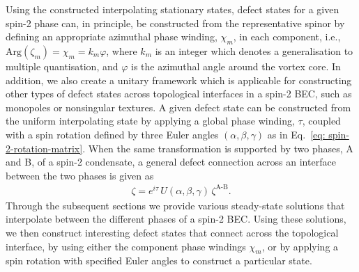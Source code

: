 Using the constructed interpolating stationary states, defect states for a given
spin-2 phase can, in principle, be constructed from
the representative spinor by defining an appropriate azimuthal phase winding,
\(\chi_m \), in each component, i.e., \(\text{Arg}(\zeta_m) =\chi_m =
k_m\varphi \), where \(k_m\) is an integer which denotes a generalisation to
multiple quantisation, and \(\varphi \) is the azimuthal angle around the vortex
core.
In addition, we also create a unitary framework which is applicable for
constructing other types of defect states across topological interfaces in a
spin-2 BEC, such as monopoles or nonsingular textures.
A given defect state can be constructed from the uniform interpolating state by
applying a global phase winding, \(\tau \), coupled with a spin rotation defined
by three Euler angles \((\alpha, \beta, \gamma)\) as in
Eq.~\eqref{eq: spin-2-rotation-matrix}.
When the same transformation is supported by two phases, A and B, of a spin-2
condensate, a general defect connection across an interface between the two
phases is given as
\begin{align}\label{eq: general-defect-interface}
    \zeta = e^{i\tau}\,U(\alpha, \beta, \gamma)\,\zeta^\text{A-B}.
\end{align}
Through the subsequent sections we provide various steady-state solutions that
interpolate between the different phases of a spin-2 BEC\@.
Using these solutions, we then construct interesting defect states that connect
across the topological interface, by using either the component phase windings
\(\chi_m\), or by applying a spin rotation with specified Euler angles to
construct a particular state.

